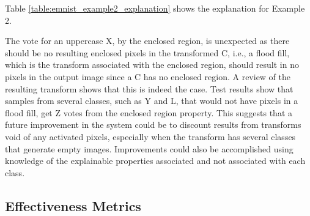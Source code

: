 Table \ref{table:emnist_example2_explanation} shows the explanation for Example 2.

\begin{table}[H]
    \renewcommand{\arraystretch}{1.3}
     \label{table:emnist_example2_explanation}
    \begin{center}
    \end{center}
\end{table}

The vote for an uppercase X, by the enclosed region, is unexpected as there
should be no resulting enclosed pixels in the transformed C, i.e., a flood fill,
which is the transform associated with the enclosed region, should result in no
pixels in the output image since a C has no enclosed region. A review of the
resulting transform shows that this is indeed the case.  Test results show that
samples from several classes, such as Y and L, that would not have pixels in a
flood fill, get Z votes from the enclosed region property.  This suggests that a
future improvement in the system could be to discount results from transforms
void of any activated pixels, especially when the transform has several classes
that generate empty images.  Improvements could also be accomplished using
knowledge of the explainable properties associated and not associated with each
class.


\subsection{Effectiveness Metrics}

